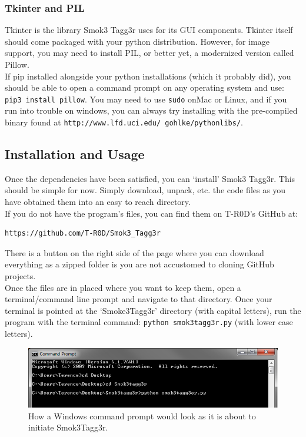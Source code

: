 \documentclass{article}
\begin{document}
\subsubsection{Tkinter and PIL}
Tkinter is the library Smok3 Tagg3r uses for its GUI components. Tkinter itself should come packaged with your python distribution. However, for image support, you may need to install PIL, or better yet, a modernized version called Pillow.\\

If pip installed alongside your python installations (which it probably did), you should be able to open a command prompt on any operating system and use: \texttt{pip3 install pillow}. You may need to use \texttt{sudo} onMac or Linux, and if you run into trouble on windows, you can always try installing with the pre-compiled binary found at \texttt{http://www.lfd.uci.edu/~gohlke/pythonlibs/}.

\subsection{Installation and Usage}
Once the dependencies have been satisfied, you can `install' Smok3 Tagg3r. This should be simple for now. Simply download, unpack, etc. the code files as you have obtained them into an easy to reach directory.\\

If you do not have the program's files, you can find them on T-R0D's GitHub at: 
\begin{verbatim}
https://github.com/T-R0D/Smok3_Tagg3r
\end{verbatim}
There is a button on the right side of the page where you can download everything as a zipped folder is you are not accustomed to cloning GitHub projects.\\

Once the files are in placed where you want to keep them, open a terminal/command line prompt and navigate to that directory. Once your terminal is pointed at the `Smoke3Tagg3r' directory (with capital letters), run the program with the terminal command: \texttt{python smok3tagg3r.py} (with lower case letters).\\

  \begin{figure}[h!]
    \centering
    \includegraphics[width=.8\linewidth]{terminal_view}
    \caption{How a Windows command prompt would look as it is about to initiate Smok3Tagg3r.}
    \label{fig:menu_bar}
  \end{figure}
\end{document}
